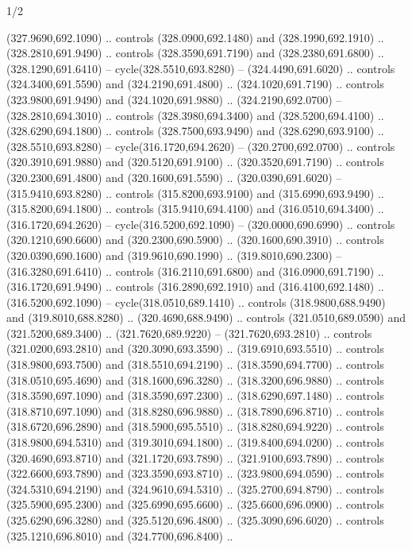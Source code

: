 \begin{flagdescription}{1/2}
\begin{scope}[xshift=0.5\flaglength]
\begin{scope}[scale=0.00745\flagwidth,xshift=-12.1mm,yshift=41.7mm]
\begin{scope}[y=0.80pt, x=0.80pt, yscale=-1, xscale=1, inner sep=0pt, outer sep=0pt]
\begin{scope}[cm={{1.33333,0.0,0.0,-1.33333,(0.0,114.66667)}}]
\begin{scope}[scale=0.100]
  (327.9690,692.1090) .. controls (328.0900,692.1480) and (328.1990,692.1910) ..
  (328.2810,691.9490) .. controls (328.3590,691.7190) and (328.2380,691.6800) ..
  (328.1290,691.6410) -- cycle(328.5510,693.8280) -- (324.4490,691.6020) ..
  controls (324.3400,691.5590) and (324.2190,691.4800) .. (324.1020,691.7190) ..
  controls (323.9800,691.9490) and (324.1020,691.9880) .. (324.2190,692.0700) --
  (328.2810,694.3010) .. controls (328.3980,694.3400) and (328.5200,694.4100) ..
  (328.6290,694.1800) .. controls (328.7500,693.9490) and (328.6290,693.9100) ..
  (328.5510,693.8280) -- cycle(316.1720,694.2620) -- (320.2700,692.0700) ..
  controls (320.3910,691.9880) and (320.5120,691.9100) .. (320.3520,691.7190) ..
  controls (320.2300,691.4800) and (320.1600,691.5590) .. (320.0390,691.6020) --
  (315.9410,693.8280) .. controls (315.8200,693.9100) and (315.6990,693.9490) ..
  (315.8200,694.1800) .. controls (315.9410,694.4100) and (316.0510,694.3400) ..
  (316.1720,694.2620) -- cycle(316.5200,692.1090) -- (320.0000,690.6990) ..
  controls (320.1210,690.6600) and (320.2300,690.5900) .. (320.1600,690.3910) ..
  controls (320.0390,690.1600) and (319.9610,690.1990) .. (319.8010,690.2300) --
  (316.3280,691.6410) .. controls (316.2110,691.6800) and (316.0900,691.7190) ..
  (316.1720,691.9490) .. controls (316.2890,692.1910) and (316.4100,692.1480) ..
  (316.5200,692.1090) -- cycle(318.0510,689.1410) .. controls
  (318.9800,688.9490) and (319.8010,688.8280) .. (320.4690,688.9490) .. controls
  (321.0510,689.0590) and (321.5200,689.3400) .. (321.7620,689.9220) --
  (321.7620,693.2810) .. controls (321.0200,693.2810) and (320.3090,693.3590) ..
  (319.6910,693.5510) .. controls (318.9800,693.7500) and (318.5510,694.2190) ..
  (318.3590,694.7700) .. controls (318.0510,695.4690) and (318.1600,696.3280) ..
  (318.3200,696.9880) .. controls (318.3590,697.1090) and (318.3590,697.2300) ..
  (318.6290,697.1480) .. controls (318.8710,697.1090) and (318.8280,696.9880) ..
  (318.7890,696.8710) .. controls (318.6720,696.2890) and (318.5900,695.5510) ..
  (318.8280,694.9220) .. controls (318.9800,694.5310) and (319.3010,694.1800) ..
  (319.8400,694.0200) .. controls (320.4690,693.8710) and (321.1720,693.7890) ..
  (321.9100,693.7890) .. controls (322.6600,693.7890) and (323.3590,693.8710) ..
  (323.9800,694.0590) .. controls (324.5310,694.2190) and (324.9610,694.5310) ..
  (325.2700,694.8790) .. controls (325.5900,695.2300) and (325.6990,695.6600) ..
  (325.6600,696.0900) .. controls (325.6290,696.3280) and (325.5120,696.4800) ..
  (325.3090,696.6020) .. controls (325.1210,696.8010) and (324.7700,696.8400) ..

\end{scope}
\end{scope}
\end{scope}
\end{scope}
\end{scope}
\end{flagdescription}
